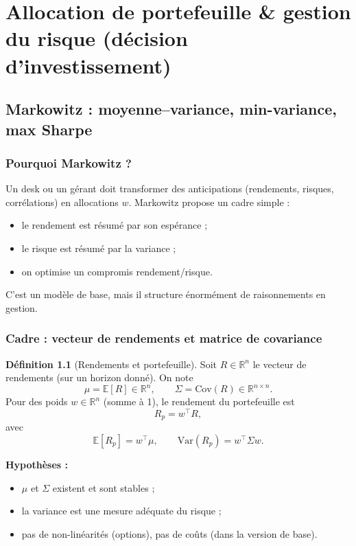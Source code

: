 \documentclass[11pt,a4paper]{report}
\newcommand{\E}{\mathbb{E}}
\newcommand{\Var}{\mathrm{Var}}
\newcommand{\Cov}{\mathrm{Cov}}
\newcommand{\R}{\mathbb{R}}
\newcommand{\1}{\mathbbm{1}}
\theoremstyle{definition}
\newtheorem{definition}{Définition}[chapter]
\theoremstyle{plain}
\theoremstyle{remark}
\begin{document}
\part{Allocation de portefeuille \& gestion du risque (décision d'investissement)}

\chapter{Markowitz : moyenne--variance, min-variance, max Sharpe}
\label{chap:markowitz}

\section{Pourquoi Markowitz ?}
Un desk ou un gérant doit transformer des anticipations (rendements, risques, corrélations)
en allocations $w$.
Markowitz propose un cadre simple :
\begin{itemize}
  \item le rendement est résumé par son espérance ;
  \item le risque est résumé par la variance ;
  \item on optimise un compromis rendement/risque.
\end{itemize}
C'est un modèle de base, mais il structure énormément de raisonnements en gestion.

\section{Cadre : vecteur de rendements et matrice de covariance}
\begin{definition}[Rendements et portefeuille]
Soit $R\in\R^n$ le vecteur de rendements (sur un horizon donné).
On note
\[
\mu=\E[R]\in\R^n,\qquad \Sigma=\Cov(R)\in\R^{n\times n}.
\]
Pour des poids $w\in\R^n$ (somme à 1), le rendement du portefeuille est
\[
R_p = w^\top R,
\]
avec
\[
\E[R_p]=w^\top \mu,\qquad \Var(R_p)=w^\top \Sigma w.
\]
\end{definition}

\textbf{Hypothèses :}
\begin{itemize}
  \item $\mu$ et $\Sigma$ existent et sont stables ;
  \item la variance est une mesure adéquate du risque ;
  \item pas de non-linéarités (options), pas de coûts (dans la version de base).
\end{itemize}
\end{document}
